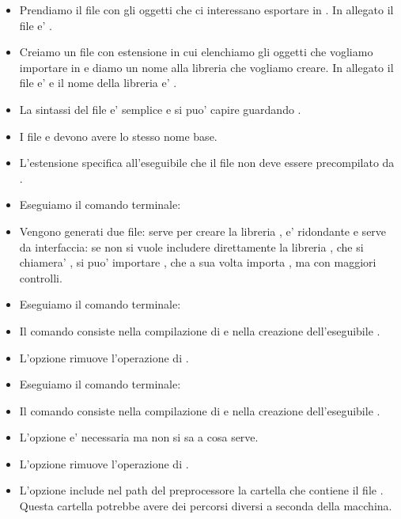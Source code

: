 \begin{itemize}
\item[\bbox] Prendiamo il file  con gli oggetti che ci interessano esportare in . In allegato il file e' .
\item[\bbox] Creiamo un file con estensione  in cui elenchiamo gli oggetti che vogliamo importare in  e diamo un nome alla libreria  che vogliamo creare. In allegato il file e'  e il nome della libreria e' .
\item[] La sintassi del file  e' semplice e si puo' capire guardando .
\item[] I file  e  devono avere lo stesso nome base.
\item[] L'estensione  specifica all'eseguibile  che il file non deve essere precompilato da .
\item[\bbox] Eseguiamo il comando terminale:\par
{}
\item[] Vengono generati due file:  serve per creare la libreria ,  e' ridondante e serve da interfaccia: se non si vuole includere direttamente la libreria , che si chiamera' , si puo' importare , che a sua volta importa , ma con maggiori controlli.
\item[\bbox] Eseguiamo il comando terminale:\par
{}
\item[] Il comando consiste nella compilazione di  e nella creazione dell'eseguibile .
\item[] L'opzione  rimuove l'operazione di .
\item[\bbox] Eseguiamo il comando terminale:\par
{}
\item[] Il comando consiste nella compilazione di  e nella creazione dell'eseguibile .
\item[] L'opzione  e' necessaria ma non si sa a cosa serve.
\item[] L'opzione  rimuove l'operazione di .
\item[] L'opzione  include nel path del preprocessore  la cartella che contiene il file . Questa cartella potrebbe avere dei percorsi diversi a seconda della macchina.

\end{itemize}
